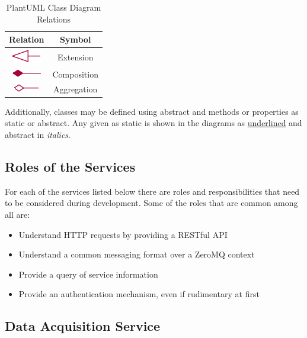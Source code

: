   \begin{table}[H]
    \centering
    \begin{tabular}{c c}
      \toprule
      Relation & Symbol \\ [0.5ex]
      \midrule
      \includegraphics{figures/design/relation-extension} & Extension \\
      \includegraphics{figures/design/relation-composition} & Composition \\
      \includegraphics{figures/design/relation-aggregation} & Aggregation \\
      \bottomrule
    \end{tabular}
    \caption{PlantUML Class Diagram Relations}\label{tab:uml-rel}
  \end{table}

  Additionally, classes may be defined using abstract and methods or properties
  as static or abstract. Any given as static is shown in the diagrams as
  \underline{underlined} and abstract in \emph{italics}.

  \subsection{Roles of the Services}\label{sec:dsg-role}

    For each of the services listed below there are roles and responsibilities
    that need to be considered during development. Some of the roles that are
    common among all are:

    \begin{itemize}
      \item Understand HTTP requests by providing a RESTful API
      \item Understand a common messaging format over a ZeroMQ context
      \item Provide a query of service information
      \item Provide an authentication mechanism, even if rudimentary at first
    \end{itemize}

    \newpage

    \subsection{Data Acquisition Service}\label{sec:dsg-role-daq}

